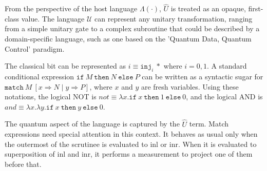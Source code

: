 From the perspective of the host language $\Lambda(\cdot)$, $\hat{U}$ is treated as an opaque, first-class value.
The language $\mathcal{U}$ can represent any unitary transformation, ranging from a simple unitary gate to a complex subroutine that could be described by a domain-specific language, such as one based on the 'Quantum Data, Quantum Control' paradigm.
\begin{ex} \label{ex:classical}
  The classical bit can be represented as $i \equiv \texttt{inj}_i\ *$ where $i=0,1$.
  A standard conditional expression $\texttt{if}\ M\ \texttt{then}\ N\ \texttt{else}\ P$ can be written as a syntactic sugar for $\texttt{match}\ M\ [x\Rightarrow N\mid y\Rightarrow P]$, where $x$ and $y$ are fresh variables.
  Using these notations, the logical NOT is $\textit{not} \equiv \lambda x.\texttt{if}\ x\ \texttt{then}\ 1\ \texttt{else}\ 0$, and the logical AND is $\textit{and} \equiv \lambda x.\lambda y.\texttt{if}\ x\ \texttt{then}\ y\ \texttt{else}\ 0$.
\end{ex}
The quantum aspect of the language is captured by the $\hat{U}$ term.
Match expressions need special attention in this context.
It behaves as usual only when the outermost of the scrutinee is evaluated to inl or inr.
When it is evaluated to superposition of inl and inr, it performs a measurement to project one of them before that.
